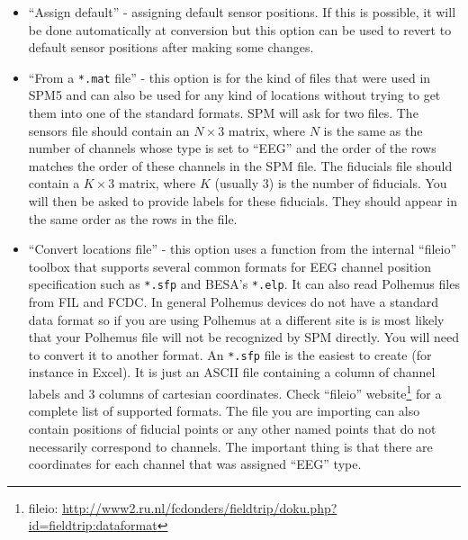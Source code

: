 \begin{itemize}
\item	``Assign default'' - assigning default sensor positions. If this is possible, it will be done automatically at conversion but this option can be used to revert to default sensor positions after making some changes.

\item ``From a \texttt{*.mat} file'' - this option is for the kind of files that were used in SPM5 and can also be used for any kind of locations without trying to get them into one of the standard formats. SPM will ask for two files. The sensors file should contain an $N \times 3$ matrix, where $N$ is the same as the number of channels whose type is set to ``EEG'' and the order of the rows matches the order of these channels in the SPM file. The fiducials file should contain a $K \times 3$ matrix, where $K$ (usually 3) is the number of fiducials. You will then be asked to provide labels for these fiducials. They should appear in the same order as the rows in the file.

\item	``Convert locations file'' - this option uses a function from the internal ``fileio'' toolbox that supports several common formats for EEG channel position specification such as \texttt{*.sfp} and BESA's \texttt{*.elp}. It can also read Polhemus files from FIL and FCDC. In general Polhemus devices do not have a standard data format so if you are using Polhemus at a different site is is most likely that your Polhemus file will not be recognized by SPM directly. You will need to convert it to another format. An \texttt{*.sfp} file is the easiest to create (for instance in Excel). It is just an ASCII file containing a column of channel labels and 3 columns of cartesian coordinates. Check ``fileio'' website\footnote{fileio: \url{http://www2.ru.nl/fcdonders/fieldtrip/doku.php?id=fieldtrip:dataformat}} for a complete list of supported formats. The file you are importing can also contain positions of fiducial points or any other named points that do not necessarily correspond to channels. The important thing is that there are coordinates for each channel that was assigned ``EEG'' type.

\end{itemize}


